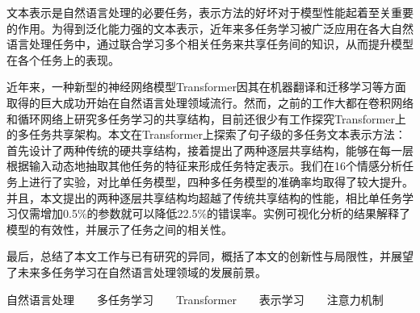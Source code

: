 \begin{cabstract}
	文本表示是自然语言处理的必要任务，表示方法的好坏对于模型性能起着至关重要的作用。为得到泛化能力强的文本表示，近年来多任务学习被广泛应用在各大自然语言处理任务中，通过联合学习多个相关任务来共享任务间的知识，从而提升模型在各个任务上的表现。
	
	近年来，一种新型的神经网络模型Transformer因其在机器翻译和迁移学习等方面取得的巨大成功开始在自然语言处理领域流行。然而，之前的工作大都在卷积网络和循环网络上研究多任务学习的共享结构，目前还很少有工作探究Transformer上的多任务共享架构。本文在Transformer上探索了句子级的多任务文本表示方法：首先设计了两种传统的硬共享结构，接着提出了两种逐层共享结构，能够在每一层根据输入动态地抽取其他任务的特征来形成任务特定表示。我们在16个情感分析任务上进行了实验，对比单任务模型，四种多任务模型的准确率均取得了较大提升。并且，本文提出的两种逐层共享结构均超越了传统共享结构的性能，相比单任务学习仅需增加0.5\%的参数就可以降低22.5\%的错误率。实例可视化分析的结果解释了模型的有效性，并展示了任务之间的相关性。
	
	最后，总结了本文工作与已有研究的异同，概括了本文的创新性与局限性，并展望了未来多任务学习在自然语言处理领域的发展前景。
\end{cabstract}


\begin{ckeywords}
	自然语言处理\ \ \ \ 多任务学习\ \ \ \ Transformer\ \ \ \ 表示学习\ \ \ \ 注意力机制
\end{ckeywords}



